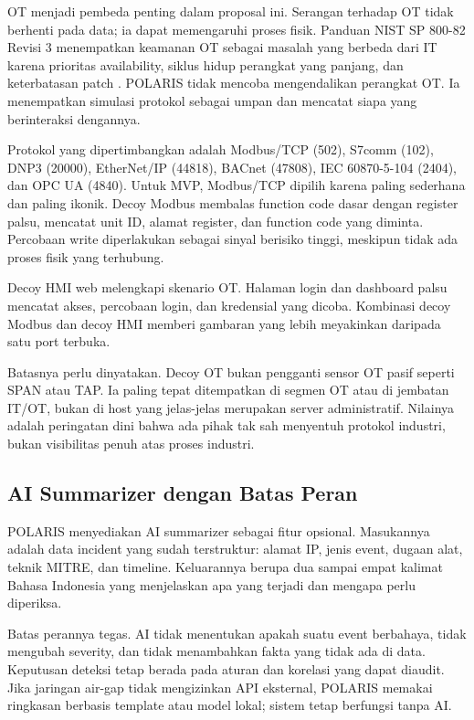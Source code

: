 \documentclass[12pt,a4paper]{article}
\begin{document}
OT menjadi pembeda penting dalam proposal ini. Serangan terhadap OT tidak berhenti pada data; ia dapat memengaruhi proses fisik. Panduan NIST SP 800-82 Revisi 3 menempatkan keamanan OT sebagai masalah yang berbeda dari IT karena prioritas availability, siklus hidup perangkat yang panjang, dan keterbatasan patch \citep{nist80082}. POLARIS tidak mencoba mengendalikan perangkat OT. Ia menempatkan simulasi protokol sebagai umpan dan mencatat siapa yang berinteraksi dengannya.

Protokol yang dipertimbangkan adalah Modbus/TCP (502), S7comm (102), DNP3 (20000), EtherNet/IP (44818), BACnet (47808), IEC 60870-5-104 (2404), dan OPC UA (4840). Untuk MVP, Modbus/TCP dipilih karena paling sederhana dan paling ikonik. Decoy Modbus membalas function code dasar dengan register palsu, mencatat unit ID, alamat register, dan function code yang diminta. Percobaan write diperlakukan sebagai sinyal berisiko tinggi, meskipun tidak ada proses fisik yang terhubung.

Decoy HMI web melengkapi skenario OT. Halaman login dan dashboard palsu mencatat akses, percobaan login, dan kredensial yang dicoba. Kombinasi decoy Modbus dan decoy HMI memberi gambaran yang lebih meyakinkan daripada satu port terbuka.

Batasnya perlu dinyatakan. Decoy OT bukan pengganti sensor OT pasif seperti SPAN atau TAP. Ia paling tepat ditempatkan di segmen OT atau di jembatan IT/OT, bukan di host yang jelas-jelas merupakan server administratif. Nilainya adalah peringatan dini bahwa ada pihak tak sah menyentuh protokol industri, bukan visibilitas penuh atas proses industri.

\subsection{AI Summarizer dengan Batas Peran}

POLARIS menyediakan AI summarizer sebagai fitur opsional. Masukannya adalah data incident yang sudah terstruktur: alamat IP, jenis event, dugaan alat, teknik MITRE, dan timeline. Keluarannya berupa dua sampai empat kalimat Bahasa Indonesia yang menjelaskan apa yang terjadi dan mengapa perlu diperiksa.

Batas perannya tegas. AI tidak menentukan apakah suatu event berbahaya, tidak mengubah severity, dan tidak menambahkan fakta yang tidak ada di data. Keputusan deteksi tetap berada pada aturan dan korelasi yang dapat diaudit. Jika jaringan air-gap tidak mengizinkan API eksternal, POLARIS memakai ringkasan berbasis template atau model lokal; sistem tetap berfungsi tanpa AI.
\end{document}
